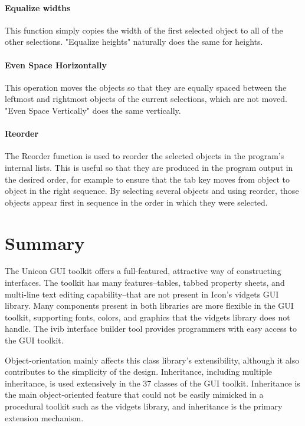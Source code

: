 \paragraph{Equalize widths}
This function simply copies the width of the first
selected object to all of the other selections. "Equalize
heights" naturally does the same for heights.

\paragraph{Even Space Horizontally}
This operation moves the objects so that they are
equally spaced between the leftmost and rightmost objects of the
current selections, which are not moved. "Even Space
Vertically" does the same vertically.

\paragraph{Reorder}
The Reorder function is used to reorder the selected objects in the
program's internal lists. This is useful so that they
are produced in the program output in the desired order, for example to
ensure that the tab key moves from object to object in the right
sequence. By selecting several objects and using reorder, those objects
appear first in sequence in the order in which they were selected.

\section{Summary}

The Unicon GUI toolkit offers a full-featured, attractive way of
constructing interfaces. The toolkit has many features--tables,
tabbed property sheets, and multi-line text editing capability--that
are not present in Icon's vidgets GUI
library. Many components present in both libraries are more
flexible in the GUI toolkit, supporting fonts, colors, and graphics
that the vidgets library does not handle. The ivib interface
builder tool provides programmers with easy access to the GUI toolkit.

Object-orientation mainly affects this class library's
extensibility, although it also contributes to the
simplicity of the design. Inheritance, including multiple inheritance,
is used extensively in the 37 classes of the GUI toolkit. Inheritance
is the main object-oriented feature that could not be easily mimicked
in a procedural toolkit such as the vidgets library, and inheritance is
the primary extension mechanism.
